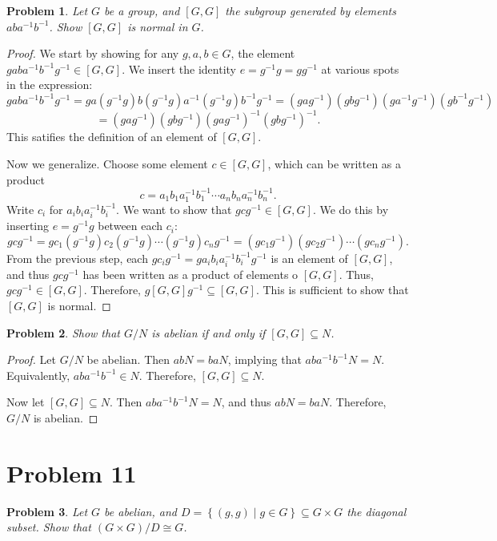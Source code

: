 \documentclass[11pt, letterpaper]{article}
\theoremstyle{plain}
\newtheorem{problem}{Problem}[section]
\begin{document}
\begin{problem}
	Let $G$ be a group, and $\left[ G,G \right] $ the subgroup generated by elements $aba^{-1} b^{-1} $. Show $[G,G]$ is normal in $G$.
\end{problem}
\begin{proof}
	We start by showing for any $g,a,b\in G$, the element $gaba^{-1} b^{-1} g^{-1} \in [G,G]$. We insert the identity $e=g^{-1} g=gg^{-1} $ at various spots in the expression:
	\[
		gaba^{-1} b^{-1} g^{-1} =ga(g^{-1} g)b(g^{-1} g)a^{-1} (g^{-1} g)b^{-1} g^{-1} =(gag^{-1} )(gbg^{-1} )(ga^{-1} g^{-1} )(gb^{-1} g^{-1} )
	\]
	\[
		=\left( gag^{-1}  \right) \left( gbg^{-1}  \right) \left( gag^{-1}  \right) ^{-1} \left( gbg^{-1}  \right) ^{-1} 
	.\]
	This satifies the definition of an element of $[G,G]$.

	Now we generalize. Choose some element $c\in [G,G]$, which can be written as a product
	\[
		c= a_1b_1a_1^{-1} b_1^{-1} \cdots a_nb_na_n ^{-1} b_n ^{-1} 
	.\]
	Write $c_i$ for $a_ib_ia_i ^{-1} b_i^{-1} $. We want to show that $gcg^{-1} \in [G,G]$. We do this by inserting $e=g^{-1} g$ between each $c_i$:
	\[
		gcg^{-1} =gc_1 (g^{-1} g)c_2(g^{-1} g)\cdots (g^{-1} g)c_n g^{-1} =(gc_1g^{-1} )(gc_2g^{-1} )\cdots(gc_ng^{-1} )
	.\]
	From the previous step, each $gc_ig^{-1} =ga_ib_i a_i ^{-1} b_i^{-1} g^{-1} $ is an element of $[G,G]$, and thus $gcg^{-1} $ has been written as a product of elements o $[G,G]$. Thus, $gcg^{-1} \in [G,G]$. Therefore, $g[G,G]g^{-1} \subseteq [G,G]$. This is sufficient to show that $[G,G]$ is normal.
\end{proof}

\begin{problem}
	Show that $G/N$ is abelian if and only if $[G,G]\subseteq N$.
\end{problem}
\begin{proof}
	Let $G/N$ be abelian. Then $abN=baN$, implying that $aba^{-1} b^{-1} N=N$. Equivalently, $aba^{-1} b^{-1} \in N$. Therefore, $[G,G]\subseteq N$.

	Now let $[G,G]\subseteq N$. Then $aba^{-1} b^{-1}N=N$, and thus $abN=baN$. Therefore, $G/N$ is abelian.
\end{proof}


\section{Problem 11}

\begin{problem}\label{11}
	Let $G$ be abelian, and $D=\left\{ (g,g)\mid g\in G \right\} \subseteq G\times G$ the diagonal subset. Show that $(G\times G) /D \cong G$.
\end{problem}
\end{document}
